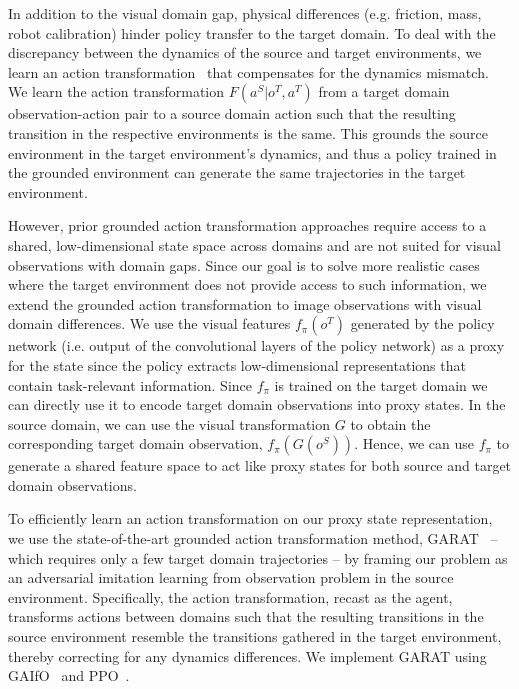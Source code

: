 In addition to the visual domain gap, physical differences (e.g. friction, mass, robot calibration) hinder policy transfer to the target domain.  To deal with the discrepancy between the dynamics of the source and target environments, we learn an action transformation~\citep{hanna2017grounded, desai2020stochastic, karnan2020reinforced, desai2020imitation} that compensates for the dynamics mismatch.
We learn the action transformation $F(a^{S}|o^T,a^{T})$ from a target domain observation-action pair to a source domain action such that the resulting transition in the respective environments is the same.  This grounds the source environment in the target environment's dynamics, and thus a policy trained in the grounded environment can generate the same trajectories in the target environment.  

However, prior grounded action transformation approaches require access to a shared, low-dimensional state space across domains and are not suited for visual observations with domain gaps. Since our goal is to solve more realistic cases where the target environment does not provide access to such information, we extend the grounded action transformation to image observations with visual domain differences.  We use the visual features $f_\pi(o^T)$ generated by the policy network (i.e. output of the convolutional layers of the policy network) as a proxy for the state since the policy extracts low-dimensional representations that contain task-relevant information.  Since $f_\pi$ is trained on the target domain we can directly use it to encode target domain observations into proxy states.  In the source domain, we can use the visual transformation $G$ to obtain the corresponding target domain observation, $f_\pi(G(o^S))$. Hence, we can use $f_\pi$ to generate a shared feature space to act like proxy states for both source and target domain observations.

To efficiently learn an action transformation on our proxy state representation, we use the state-of-the-art grounded action transformation method, GARAT~\citep{desai2020imitation} -- which requires only a few target domain trajectories -- by framing our problem as an adversarial imitation learning from observation problem in the source environment.  Specifically, the action transformation, recast as the agent, transforms actions between domains such that the resulting transitions in the source environment resemble the transitions gathered in the target environment, thereby correcting for any dynamics differences.   
We implement GARAT using GAIfO~\citep{torabi2018generative} and PPO~\citep{PPO}.


